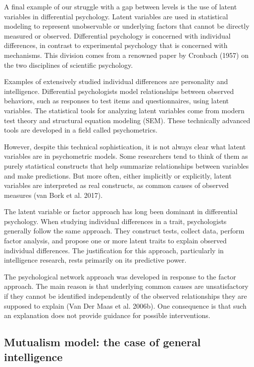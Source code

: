 \documentclass[
  a4paper,
  DIV=11,
  numbers=noendperiod,
  oneside]{scrreprt}
\begin{document}
A final example of our struggle with a gap between levels is the use of
latent variables in differential psychology. Latent variables are used
in statistical modeling to represent unobservable or underlying factors
that cannot be directly measured or observed. Differential psychology is
concerned with individual differences, in contrast to experimental
psychology that is concerned with mechanisms. This division comes from a
renowned paper by Cronbach (1957) on the two disciplines of scientific
psychology.

Examples of extensively studied individual differences are personality
and intelligence. Differential psychologists model relationships between
observed behaviors, such as responses to test items and questionnaires,
using latent variables. The statistical tools for analyzing latent
variables come from modern test theory and structural equation modeling
(SEM). These technically advanced tools are developed in a field called
psychometrics.

However, despite this technical sophistication, it is not always clear
what latent variables are in psychometric models. Some researchers tend
to think of them as purely statistical constructs that help summarize
relationships between variables and make predictions. But more often,
either implicitly or explicitly, latent variables are interpreted as
real constructs, as common causes of observed measures (van Bork et al.
2017).

The latent variable or factor approach has long been dominant in
differential psychology. When studying individual differences in a
trait, psychologists generally follow the same approach. They construct
tests, collect data, perform factor analysis, and propose one or more
latent traits to explain observed individual differences. The
justification for this approach, particularly in intelligence research,
rests primarily on its predictive power.

The psychological network approach was developed in response to the
factor approach. The main reason is that underlying common causes are
unsatisfactory if they cannot be identified independently of the
observed relationships they are supposed to explain (Van Der Maas et al.
2006b). One consequence is that such an explanation does not provide
guidance for possible interventions.

\hypertarget{sec-Mutualism-model-the-case-of-general-intelligence}{%
\subsection{Mutualism model: the case of general
intelligence}\label{sec-Mutualism-model-the-case-of-general-intelligence}}
\end{document}
